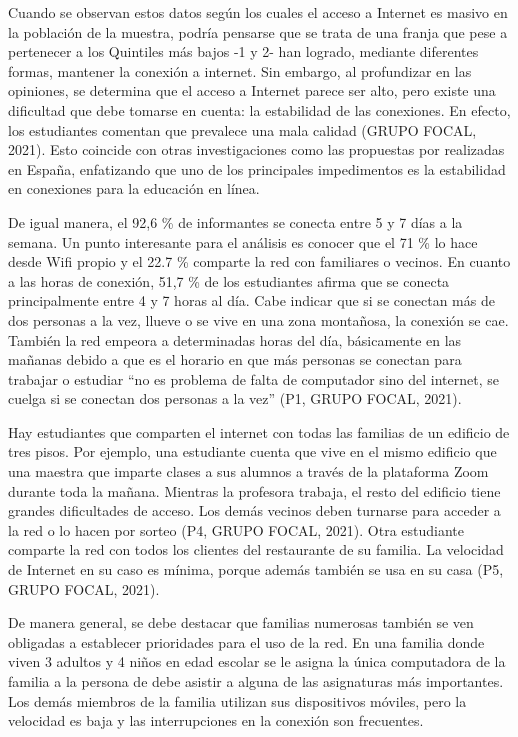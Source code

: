 \documentclass{textolivre}
\begin{document}
Cuando se observan estos datos según los cuales el acceso a Internet es masivo en la población de la muestra, podría pensarse que se trata de una franja que pese a pertenecer a los Quintiles más bajos -1 y 2- han logrado, mediante diferentes formas, mantener la conexión a internet. Sin embargo, al profundizar en las opiniones, se determina que el acceso a Internet parece ser alto, pero existe una dificultad que debe tomarse en cuenta: la estabilidad de las conexiones. En efecto, los estudiantes comentan que prevalece una mala calidad (GRUPO FOCAL, 2021). Esto coincide con otras investigaciones como las propuestas por \textcite{pericacho_experiencias_2020} realizadas en España, enfatizando que uno de los principales impedimentos es la estabilidad en conexiones para la educación en línea.

De igual manera, el 92,6 \% de informantes se conecta entre 5 y 7 días a la semana. Un punto interesante para el análisis es conocer que el 71 \% lo hace desde Wifi propio y el 22.7 \% comparte la red con familiares o vecinos. En cuanto a las horas de conexión, 51,7 \% de los estudiantes afirma que se conecta principalmente entre 4 y 7 horas al día. Cabe indicar que si se conectan más de dos personas a la vez, llueve o se vive en una zona montañosa, la conexión se cae. También la red empeora a determinadas horas del día, básicamente en las mañanas debido a que es el horario en que más personas se conectan para trabajar o estudiar “no es problema de falta de computador sino del internet, se cuelga si se conectan dos personas a la vez” (P1, GRUPO FOCAL, 2021).

Hay estudiantes que comparten el internet con todas las familias de un edificio de tres pisos. Por ejemplo, una estudiante cuenta que vive en el mismo edificio que una maestra que imparte clases a sus alumnos a través de la plataforma Zoom durante toda la mañana. Mientras la profesora trabaja, el resto del edificio tiene grandes dificultades de acceso. Los demás vecinos deben turnarse para acceder a la red o lo hacen por sorteo (P4, GRUPO FOCAL, 2021). Otra estudiante comparte la red con todos los clientes del restaurante de su familia. La velocidad de Internet en su caso es mínima, porque además también se usa en su casa (P5, GRUPO FOCAL, 2021).

De manera general, se debe destacar que familias numerosas también se ven obligadas a establecer prioridades para el uso de la red. En una familia donde viven 3 adultos y 4 niños en edad escolar se le asigna la única computadora de la familia a la persona de debe asistir a alguna de las asignaturas más importantes. Los demás miembros de la familia utilizan sus dispositivos móviles, pero la velocidad es baja y las interrupciones en la conexión son frecuentes.
\end{document}
